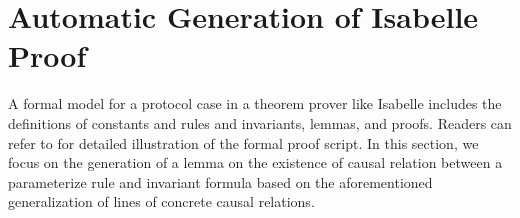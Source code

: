 \documentclass[conference]{IEEEtran}
\def \eqc {\doteq }
\def \negc {!}
\def \iInv {iInv}
\def \iR {iR}
\begin{document}
{%

\vspace{-0.3cm}
\section{Automatic Generation of Isabelle Proof }
\vspace{-0.3cm}
A formal model for a protocol case in a theorem prover like Isabelle
includes the definitions of constants and rules and invariants,
lemmas, and proofs. Readers can refer to \cite{LiCache16} for detailed illustration of the formal proof script. In this section, we focus on the generation of a lemma on the existence of causal relation between a parameterize rule and invariant formula based on the aforementioned generalization of lines of concrete causal relations. %

}
\end{document}
